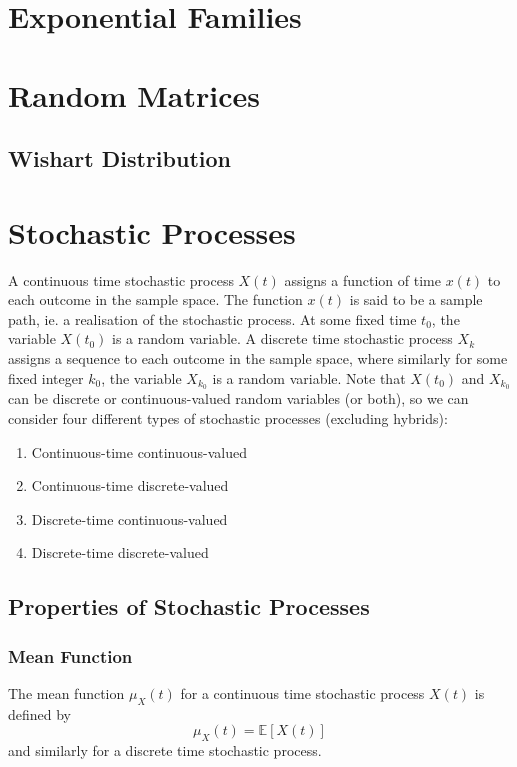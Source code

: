 \documentclass[11pt]{report} %
\begin{document}
\section{Exponential Families}

\section{Random Matrices}

\subsection{Wishart Distribution}

\section{Stochastic Processes}

A continuous time stochastic process $X\left(t\right)$ assigns a function of time $x\left(t\right)$ to each outcome in the sample space. The function $x\left(t\right)$ is said to be a sample path, ie. a realisation of the stochastic process. At some fixed time $t_{0}$, the variable $X\left(t_{0}\right)$ is a random variable. A discrete time stochastic process $X_{k}$ assigns a sequence to each outcome in the sample space, where similarly for some fixed integer $k_{0}$, the variable $X_{k_{0}}$ is a random variable. Note that $X\left(t_{0}\right)$ and $X_{k_{0}}$ can be discrete or continuous-valued random variables (or both), so we can consider four different types of stochastic processes (excluding hybrids):
\begin{enumerate}
\item Continuous-time continuous-valued
\item Continuous-time discrete-valued
\item Discrete-time continuous-valued
\item Discrete-time discrete-valued
\end{enumerate}

\subsection{Properties of Stochastic Processes}

\subsubsection{Mean Function}

The mean function $\mu_{X}\left(t\right)$ for a continuous time stochastic process $X\left(t\right)$ is defined by
\begin{equation}
\mu_{X}\left(t\right) = \mathbb{E}\left[X\left(t\right)\right]
\end{equation}
and similarly for a discrete time stochastic process.
\end{document}

